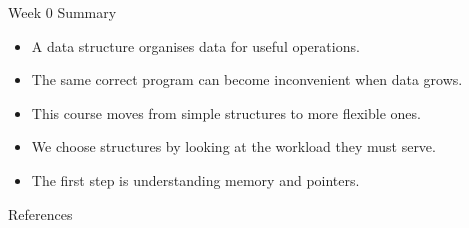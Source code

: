 \documentclass[aspectratio=169]{beamer}
\begin{document}
\begin{frame}{Week 0 Summary}
  \begin{itemize}
    \item A data structure organises data for useful operations.
    \item The same correct program can become inconvenient when data grows.
    \item This course moves from simple structures to more flexible ones.
    \item We choose structures by looking at the workload they must serve.
    \item The first step is understanding memory and pointers.
  \end{itemize}
\end{frame}

\begin{frame}[allowframebreaks]{References}
  \footnotesize
  
  
\end{frame}
\end{document}
